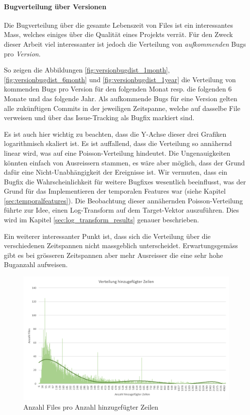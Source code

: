 \documentclass[10pt, a4paper]{article}
\begin{document}
\paragraph{Bugverteilung über Versionen} Die Bugverteilung über die gesamte Lebenszeit von Files ist ein interessantes Mass, welches einiges über die Qualität eines Projekts verrät. Für den Zweck dieser Arbeit viel interessanter ist jedoch die Verteilung von \emph{aufkommenden} Bugs pro \emph{Version}.

So zeigen die Abbildungen \ref{fig:versionbugdist_1month}, \ref{fig:versionbugdist_6month} und \ref{fig:versionbugdist_1year} die Verteilung von kommenden Bugs pro Version für den folgenden Monat resp. die folgenden 6 Monate und das folgende Jahr. Als aufkommende Bugs für eine Version gelten alle zukünftigen Commits in der jeweiligen Zeitspanne, welche auf dasselbe File verweisen und über das Issue-Tracking als Bugfix markiert sind.

Es ist auch hier wichtig zu beachten, dass die Y-Achse dieser drei Grafiken logarithmisch skaliert ist. Es ist auffallend, dass die Verteilung so annähernd linear wird, was auf eine Poisson-Verteilung hindeutet. Die Ungenauigkeiten könnten einfach von Ausreissern stammen, es wäre aber möglich, dass der Grund dafür eine Nicht-Unabhängigkeit der Ereignisse ist. Wir vermuten, dass ein Bugfix die Wahrscheinlichkeit für weitere Bugfixes wesentlich beeinflusst, was der Grund für das Implementieren der temporalen Features war (siehe Kapitel \ref{sec:temporalfeatures}). Die Beobachtung dieser annähernden Poisson-Verteilung führte zur Idee, einen Log-Transform auf dem Target-Vektor auszuführen. Dies wird im Kapitel \ref{sec:log_transform_results} genauer beschrieben.

Ein weiterer interessanter Punkt ist, dass sich die Verteilung über die verschiedenen Zeitspannen nicht massgeblich unterscheidet. Erwartungsgemäss gibt es bei grösseren Zeitspannen aber mehr Ausreisser die eine sehr hohe Buganzahl aufweisen.

\begin{figure}[!ht]
	\centering
	\includegraphics[width=1\textwidth]{resources/images/chart_addition_distribution.png}
	\caption{Anzahl Files pro Anzahl hinzugefügter Zeilen}
	\label{fig:filecountperadditions}
\end{figure}
\end{document}

